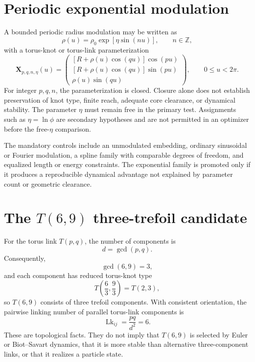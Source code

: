 \documentclass[11pt]{article}
\newcommand{\Z}{\mathbb Z}
\begin{document}
\section{Periodic exponential modulation}

A bounded periodic radius modulation may be written as
\begin{equation}
    \rho(u)
    =
    \rho_0\exp\!\left[\eta\sin(nu)\right],
    \qquad
    n\in\Z,
    \label{eq:spec_periodic_exponential_radius}
\end{equation}
with a torus-knot or torus-link parameterization
\begin{equation}
    \mathbf X_{p,q,n,\eta}(u)
    =
    \begin{pmatrix}
    [R+\rho(u)\cos(qu)]\cos(pu)\\
    [R+\rho(u)\cos(qu)]\sin(pu)\\
    \rho(u)\sin(qu)
    \end{pmatrix},
    \qquad 0\le u<2\pi.
    \label{eq:spec_periodically_modulated_torus_embedding}
\end{equation}
For integer $p,q,n$, the parameterization is closed.  Closure alone does not
establish preservation of knot type, finite reach, adequate core clearance,
or dynamical stability.  The parameter $\eta$ must remain free in the primary
test.  Assignments such as $\eta=\ln\phi$ are secondary hypotheses and are not
permitted in an optimizer before the free-$\eta$ comparison.

The mandatory controls include an unmodulated embedding, ordinary sinusoidal
or Fourier modulation, a spline family with comparable degrees of freedom,
and equalized length or energy constraints.  The exponential family is
promoted only if it produces a reproducible dynamical advantage not explained
by parameter count or geometric clearance.

\section{The $T(6,9)$ three-trefoil candidate}

For the torus link $T(p,q)$, the number of components is
\begin{equation}
    d=\gcd(p,q).
\end{equation}
Consequently,
\begin{equation}
    \gcd(6,9)=3,
\end{equation}
and each component has reduced torus-knot type
\begin{equation}
    T\!\left(\frac{6}{3},\frac{9}{3}\right)
    =T(2,3),
\end{equation}
so $T(6,9)$ consists of three trefoil components.  With consistent orientation,
the pairwise linking number of parallel torus-link components is
\begin{equation}
    \operatorname{Lk}_{ij}
    =
    \frac{pq}{d^2}
    =6.
\end{equation}
These are topological facts.  They do not imply that $T(6,9)$ is selected by
Euler or Biot--Savart dynamics, that it is more stable than alternative
three-component links, or that it realizes a particle state.
\end{document}
